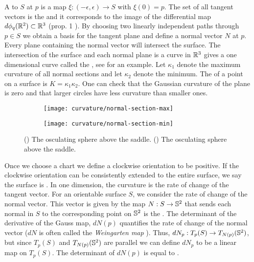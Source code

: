 A  to $S$ at $p$ is a map $\xi:(-\epsilon,\epsilon)\to S$ with $\xi(0)=p$.
The set of all tangent vectors is the  and it corresponds to the image
of the differential map $d\phi_q(\mathbb{R}^2)\subset \mathbb{R}^3$ (prop. 1 \cite{doc76}).
By choosing two linearly independent paths through $p\in S$ we obtain a basis 
for the tangent
plane and define a normal vector $N$ at $p$.
Every plane containing the normal vector will intersect the surface.
The intersection of the surface and each normal plane is a curve in $\mathbb{R}^3$
gives a one dimensional curve called the , see  
for an example.
Let $\kappa_1$ denote the maximum curvature of all normal sections 
and let $\kappa_2$ denote the minimum. 
The  of a point on a surface is
$K=\kappa_1\kappa_2.$
One can check that the Gaussian curvature of the plane is zero and
that larger circles have less curvature than smaller ones.



\begin{figure}[htb]
    \captionsetup[subfigure]{justification=centering}
    \centering
    \begin{subfigure}[b]{0.25\textwidth}
        \texttt{[image: curvature/normal-section-max]}
       \subcaption{}\label{fig:normal-section-max}
    \end{subfigure}
        \hspace{1cm}
        \begin{subfigure}[b]{0.25\textwidth}
        \texttt{[image: curvature/normal-section-min]}
        \subcaption{}\label{fig:normal-section-min}
        \end{subfigure}
    \caption{() The osculating sphere above the saddle.
        () The osculating sphere above the saddle.
    }
    \label{fig:normal-sections}
\end{figure}

Once we choose a chart we define a clockwise orientation to be positive.
 If the clockwise
orientation can be consistently extended to the entire surface, we say
the surface is .
In one dimension, the curvature is the rate of change of the tangent vector.
For an orientable surface $S$, we consider the rate of change of the normal vector.
This vector is given by the map  $N:S\to \mathbb{S}^2$ that sends each
normal in $S$ to the corresponding point on $\mathbb{S}^2$ is
the .
The determinant of the derivative of the Gauss map, $dN(p)$ quantifies the rate of change of
the normal vector ($dN$ is often called the \emph{Weingarten map} \cite{Crane:2013}).
Thus, $dN_p:T_p(S)\to T_{N(p)}(\mathbb{S}^2)$, but since $T_p(S)$ and $T_{N(p)}(\mathbb{S}^2)$
are parallel we can define $dN_p$ to be a linear map on $T_p(S)$.
The determinant of $dN(p)$ is equal to .

